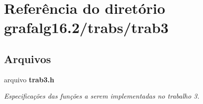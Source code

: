 \section{Referência do diretório grafalg16.2/trabs/trab3}
\label{dir_387d951f8fa43442333b4198ce4df82f}
\subsection*{Arquivos}
\begin{DoxyCompactItemize}
\item 
arquivo {\bf trab3.\+h}
\begin{DoxyCompactList}\small\item\em Especificações das funções a serem implementadas no trabalho 3. \end{DoxyCompactList}\end{DoxyCompactItemize}

